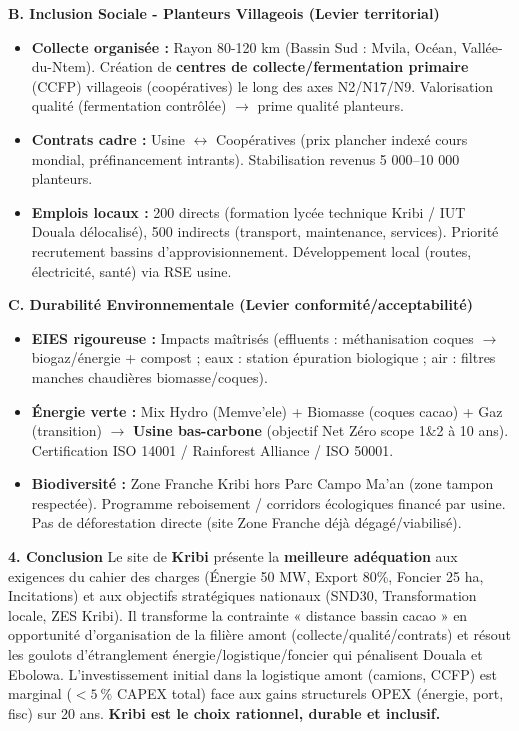 \documentclass[11pt]{article}
\newcommand{\cle}[1]{{\popxbold\color{popdark}#1}}
\begin{document}
\begin{exoresolu}
\textbf{B. Inclusion Sociale - Planteurs Villageois (Levier territorial)}
\begin{itemize}
    \item \textbf{Collecte organisée :} Rayon 80-120 km (Bassin Sud : Mvila, Océan, Vallée-du-Ntem). Création de \textbf{centres de collecte/fermentation primaire} (CCFP) villageois (coopératives) le long des axes N2/N17/N9. Valorisation qualité (fermentation contrôlée) $\rightarrow$ prime qualité planteurs.
    \item \textbf{Contrats cadre :} Usine $\leftrightarrow$ Coopératives (prix plancher indexé cours mondial, préfinancement intrants). Stabilisation revenus 5 000--10 000 planteurs.
    \item \textbf{Emplois locaux :} 200 directs (formation lycée technique Kribi / IUT Douala délocalisé), 500 indirects (transport, maintenance, services). Priorité recrutement bassins d'approvisionnement. Développement local (routes, électricité, santé) via RSE usine.
\end{itemize}

\textbf{C. Durabilité Environnementale (Levier conformité/acceptabilité)}
\begin{itemize}
    \item \textbf{EIES rigoureuse :} Impacts maîtrisés (effluents : méthanisation coques $\rightarrow$ biogaz/énergie + compost ; eaux : station épuration biologique ; air : filtres manches chaudières biomasse/coques).
    \item \textbf{Énergie verte :} Mix Hydro (Memve'ele) + Biomasse (coques cacao) + Gaz (transition) $\rightarrow$ \textbf{Usine bas-carbone} (objectif \cle{Net Zéro} scope 1\&2 à 10 ans). Certification \cle{ISO 14001} / \cle{Rainforest Alliance} / \cle{ISO 50001}.
    \item \textbf{Biodiversité :} Zone Franche Kribi hors Parc Campo Ma'an (zone tampon respectée). Programme reboisement / corridors écologiques financé par usine. Pas de déforestation directe (site Zone Franche déjà dégagé/viabilisé).
\end{itemize}

\textbf{4. Conclusion}
Le site de \textbf{Kribi} présente la \textbf{meilleure adéquation} aux exigences du cahier des charges (Énergie 50 MW, Export 80\%, Foncier 25 ha, Incitations) et aux objectifs stratégiques nationaux (SND30, Transformation locale, ZES Kribi). Il transforme la contrainte « distance bassin cacao » en opportunité d'\cle{organisation de la filière amont} (collecte/qualité/contrats) et résout les goulots d'étranglement énergie/logistique/foncier qui pénalisent Douala et Ebolowa. L'investissement initial dans la logistique amont (camions, CCFP) est marginal ($< \SI{5}{\%}$ CAPEX total) face aux gains structurels OPEX (énergie, port, fisc) sur 20 ans. \textbf{Kribi est le choix rationnel, durable et inclusif.}


\end{exoresolu}
\end{document}
